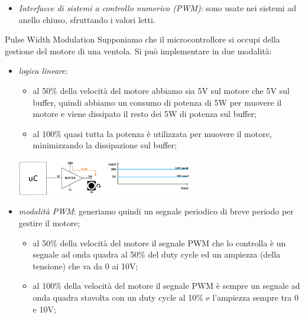 \documentclass[
]{book}
\providecommand{\tightlist}{%
  \setlength{\itemsep}{0pt}\setlength{\parskip}{0pt}}
\begin{document}
\begin{itemize}
\tightlist
\item
  \emph{Interfacce di sistemi a controllo numerico (PWM)}: sono usate
  nei sistemi ad anello chiuso, sfruttando i valori letti.
\end{itemize}

\begin{redbox}{Pulse Width Modulation}
Supponiamo che il microcontrollore si occupi della gestione del motore di una ventola. Si può implementare in due modalità:

\begin{itemize}
\tightlist
\item
  \emph{logica lineare}:

  \begin{itemize}
  \tightlist
  \item
    al 50\% della velocità del motore abbiamo sia 5V sul motore che 5V
    sul buffer, quindi abbiamo un consumo di potenza di 5W per muovere
    il motore e viene dissipato il resto dei 5W di potenza sul buffer;
  \item
    al 100\% quasi tutta la potenza è utilizzata per muovere il motore,
    minimizzando la dissipazione sul buffer;
  \end{itemize}

\begin{center}
\begin{minipage}[c]{0.8\linewidth}
\center\includegraphics[width=0.6\textwidth]{assets/imgs/linear_mode.png}
\end{minipage}
\end{center}
    
\item
  \emph{modalità PWM}: generiamo quindi un segnale periodico di breve
  periodo per gestire il motore;

  \begin{itemize}
  \tightlist
  \item
    al 50\% della velocità del motore il segnale PWM che lo controlla è
    un segnale ad onda quadra al 50\% del duty cycle ed un ampiezza
    (della tensione) che va da 0 ai 10V;
  \item
    al 100\% della velocità del motore il segnale PWM è sempre un
    segnale ad onda quadra stavolta con un duty cycle al 10\% e
    l'ampiezza sempre tra 0 e 10V;
  \end{itemize}
\end{itemize}


\end{redbox}
\end{document}
